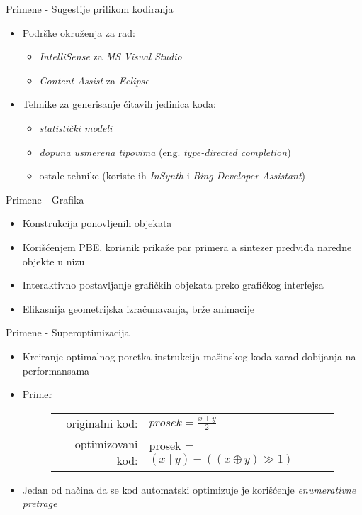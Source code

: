 \documentclass{beamer}
\begin{document}
\begin{frame}{Primene - Sugestije prilikom kodiranja}
    \begin{itemize}
        \item Podrške okruženja za rad:
        \begin{itemize}
            \item \emph{IntelliSense} za \emph{MS Visual Studio}
            \item \emph{Content Assist} za \emph{Eclipse}
        \end{itemize}
        \item Tehnike za generisanje čitavih jedinica koda:
        \begin{itemize}
            \item \emph{statistički modeli}
            \item \emph{dopuna usmerena tipovima} (eng. \emph{type-directed completion})
            \item ostale tehnike (koriste ih \emph{InSynth} i \emph{Bing Developer Assistant})
        \end{itemize}
    \end{itemize}
\end{frame}

\begin{frame}{Primene - Grafika}
    \begin{itemize}
        \item Konstrukcija ponovljenih objekata
        \item Korišćenjem PBE, korisnik prikaže par primera a sintezer predviđa naredne objekte u nizu
        \item Interaktivno postavljanje grafičkih objekata preko grafičkog interfejsa
        \item Efikasnija geometrijska izračunavanja, brže animacije
    \end{itemize}
\end{frame}


\begin{frame}{Primene - Superoptimizacija}
    \begin{itemize}
        \item Kreiranje optimalnog poretka instrukcija mašinskog koda zarad dobijanja na performansama
        \item Primer
        \begin{figure}[!h]
            \centering
            \small
            \begin{tabular}{rl}
                originalni kod: & $\mathit{prosek}=\frac{x+y}{2}$\\
                optimizovani kod: & prosek = $(x \mid y)-((x \oplus y) \gg 1)$
            \end{tabular}
        \end{figure}
        \item Jedan od načina da se kod automatski optimizuje je korišćenje  \emph{enumerativne pretrage}
    \end{itemize}
\end{frame}
\end{document}
